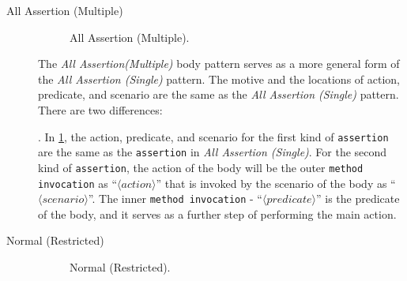 \begin{description}
\item[All Assertion (Multiple)] 

\begin{figure}[htbp]
\centering
    \begin{subfigure}{0.8\textwidth}
    \end{subfigure}
\caption{All Assertion (Multiple).}
\label{AllA_mutiple}
\end{figure}

The \textit{All Assertion(Multiple)} body pattern serves as a more general form of the \textit{All Assertion (Single)} pattern.
%
The motive and the locations of action, predicate, and scenario are the same as the \textit{All Assertion (Single)} pattern.
%
There are two differences:
.
%
In \cref{AllA_mutiple}, the action, predicate, and scenario for the first kind of \texttt{assertion} are the same as the \texttt{assertion} in \textit{All Assertion (Single)}.
%
For the second kind of \texttt{assertion}, the action of the body will be the outer \texttt{method invocation} as \enquote{$\langle action \rangle$} that is invoked by the scenario of the body as \enquote{$\langle scenario \rangle$}.
%
The inner \texttt{method invocation} - \enquote{$\langle predicate \rangle$} is the predicate of the body, and it serves as a further step of performing the main action.


\item[Normal (Restricted)] 

\begin{figure}[htbp]
\centering
    \begin{subfigure}{0.675\textwidth}
    \end{subfigure}
\caption{Normal (Restricted).}
\label{NP_2/3}
\end{figure}



\end{description}
